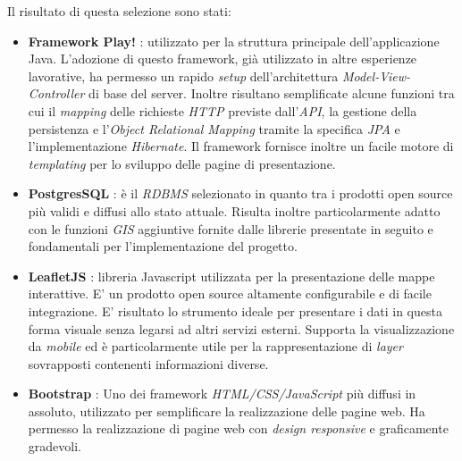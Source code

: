 Il risultato di questa selezione sono stati:
\begin{itemize}
\item \textbf{Framework Play!} \cite{playframework}: utilizzato per la struttura principale dell'applicazione Java. L'adozione di questo framework, già utilizzato in altre esperienze lavorative, ha permesso un rapido \emph{setup} dell'architettura \emph{Model-View-Controller} di base del server. Inoltre risultano semplificate alcune funzioni tra cui il \emph{mapping} delle richieste \emph{HTTP} previste dall'\emph{API}, la gestione della persistenza e l'\emph{Object Relational Mapping} tramite la specifica \emph{JPA} e l'implementazione \emph{Hibernate}. Il framework fornisce inoltre un facile motore di \emph{templating} per lo sviluppo delle pagine di presentazione.
\item \textbf{PostgresSQL} \cite{postgresql}: è il \emph{RDBMS} selezionato in quanto tra i prodotti open source più validi e diffusi allo stato attuale. Risulta inoltre particolarmente adatto con le funzioni \emph{GIS} aggiuntive fornite dalle librerie presentate in seguito e fondamentali per l'implementazione del progetto.
\item \textbf{LeafletJS} \cite{leafletjs}: libreria Javascript utilizzata per la presentazione delle mappe interattive. E' un prodotto open source altamente configurabile e di facile integrazione. E' risultato lo strumento ideale per presentare i dati in questa forma visuale senza legarsi ad altri servizi esterni. Supporta la visualizzazione da \emph{mobile} ed è particolarmente utile per la rappresentazione di \emph{layer} sovrapposti contenenti informazioni diverse.
\item \textbf{Bootstrap} \cite{bootstrap}: Uno dei framework \emph{HTML/CSS/JavaScript} più diffusi in assoluto, utilizzato per semplificare la realizzazione delle pagine web. Ha permesso la realizzazione di pagine web con \emph{design responsive} e graficamente gradevoli.
\end{itemize}
